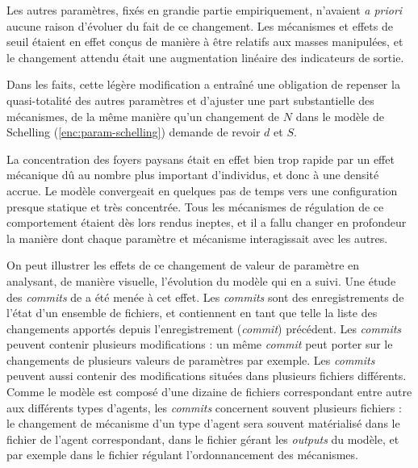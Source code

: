 Les autres paramètres, fixés en grandie partie empiriquement, n'avaient \textit{a priori} aucune raison d'évoluer du fait de ce changement.
Les mécanismes et effets de seuil étaient en effet conçus de manière à être relatifs aux masses manipulées, et le changement attendu était une augmentation linéaire des indicateurs de sortie.

Dans les faits, cette légère modification a entraîné une obligation de repenser la quasi-totalité des autres paramètres et d'ajuster une part substantielle des mécanismes, de la même manière qu'un changement de $N$ dans le modèle de Schelling (\cref{enc:param-schelling}) demande de revoir $d$ et $S$.

La concentration des foyers paysans était en effet bien trop rapide par un effet mécanique dû au nombre plus important d'individus, et donc à une densité accrue.
Le modèle convergeait en quelques pas de temps vers une configuration presque statique et très concentrée.
Tous les mécanismes de régulation de ce comportement étaient dès lors rendus ineptes, et il a fallu changer en profondeur la manière dont chaque paramètre et mécanisme interagissait avec les autres.

On peut illustrer les effets de ce changement de valeur de paramètre en analysant, de manière visuelle, l'évolution du modèle qui en a suivi.
Une étude des \og \textit{commits}\fg{} de \simfeodal{} a été menée à cet effet.
Les \textit{commits} sont des enregistrements de l'état d'un ensemble de fichiers, et contiennent en tant que telle la liste des changements apportés depuis l'enregistrement (\textit{commit}) précédent.
Les \textit{commits} peuvent contenir plusieurs modifications : un même \textit{commit} peut porter sur le changements de plusieurs valeurs de paramètres par exemple.
Les \textit{commits} peuvent aussi contenir des modifications situées dans plusieurs fichiers différents.
Comme le modèle \simfeodal{} est composé d'une dizaine de fichiers correspondant entre autre aux différents types d'agents, les \textit{commits} concernent souvent plusieurs fichiers : le changement de mécanisme d'un type d'agent sera souvent matérialisé dans le fichier de l'agent correspondant, dans le fichier gérant les \textit{outputs} du modèle, et par exemple dans le fichier régulant l'ordonnancement des mécanismes.

